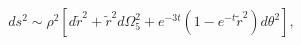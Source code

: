 \begin{equation}
ds^2 \sim \rho^2\left[ d\tilde{r}^2+\tilde{r}^2d\Omega_5^2+e^{-3t}(1-e^{-t}\tilde{r}^2)d\theta^2\right],
\end{equation}

